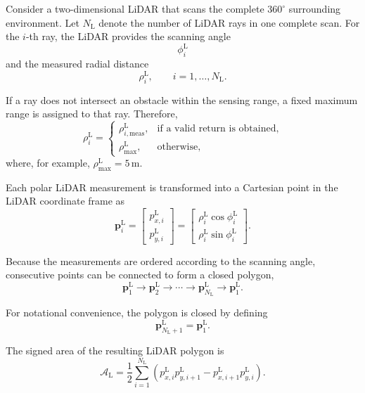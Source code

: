 \documentclass[a4paper]{article}
\begin{document}
         Consider a two-dimensional LiDAR that scans the complete \(360^\circ\) surrounding environment. Let \(N_{\mathrm{L}}\) denote the number of LiDAR rays in one complete scan. For the \(i\)-th ray, the LiDAR provides the scanning angle
         \[
         \phi_i^{\mathrm{L}}
         \]
         and the measured radial distance
         \[
         \rho_i^{\mathrm{L}},
         \qquad
         i=1,\ldots,N_{\mathrm{L}}.
         \]

         If a ray does not intersect an obstacle within the sensing range, a fixed maximum range is assigned to that ray. Therefore,
         \[
         \rho_i^{\mathrm{L}}
         =
         \begin{cases}
            \rho_{i,\mathrm{meas}}^{\mathrm{L}},
            & \text{if a valid return is obtained},\\[4pt]
            \rho_{\max}^{\mathrm{L}},
            & \text{otherwise},
         \end{cases}
         \]
         where, for example, \(\rho_{\max}^{\mathrm{L}}=5\,\mathrm{m}\).

         Each polar LiDAR measurement is transformed into a Cartesian point in the LiDAR coordinate frame as
         \[
         \mathbf{p}_i^{\mathrm{L}}
         =
         \begin{bmatrix}
            p_{x,i}^{\mathrm{L}}\\
            p_{y,i}^{\mathrm{L}}
         \end{bmatrix}
         =
         \begin{bmatrix}
            \rho_i^{\mathrm{L}}\cos\phi_i^{\mathrm{L}}\\
            \rho_i^{\mathrm{L}}\sin\phi_i^{\mathrm{L}}
         \end{bmatrix}.
         \]

         Because the measurements are ordered according to the scanning angle, consecutive points can be connected to form a closed polygon,
         \[
         \mathbf{p}_1^{\mathrm{L}}
         \rightarrow
         \mathbf{p}_2^{\mathrm{L}}
         \rightarrow
         \cdots
         \rightarrow
         \mathbf{p}_{N_{\mathrm{L}}}^{\mathrm{L}}
         \rightarrow
         \mathbf{p}_1^{\mathrm{L}}.
         \]

         For notational convenience, the polygon is closed by defining
         \[
         \mathbf{p}_{N_{\mathrm{L}}+1}^{\mathrm{L}}
         =
         \mathbf{p}_1^{\mathrm{L}}.
         \]

         The signed area of the resulting LiDAR polygon is
         \[
         \mathcal{A}_{\mathrm{L}}
         =
         \frac{1}{2}
         \sum_{i=1}^{N_{\mathrm{L}}}
         \left(
         p_{x,i}^{\mathrm{L}}p_{y,i+1}^{\mathrm{L}}
         -
         p_{x,i+1}^{\mathrm{L}}p_{y,i}^{\mathrm{L}}
         \right).
         \]
\end{document}
